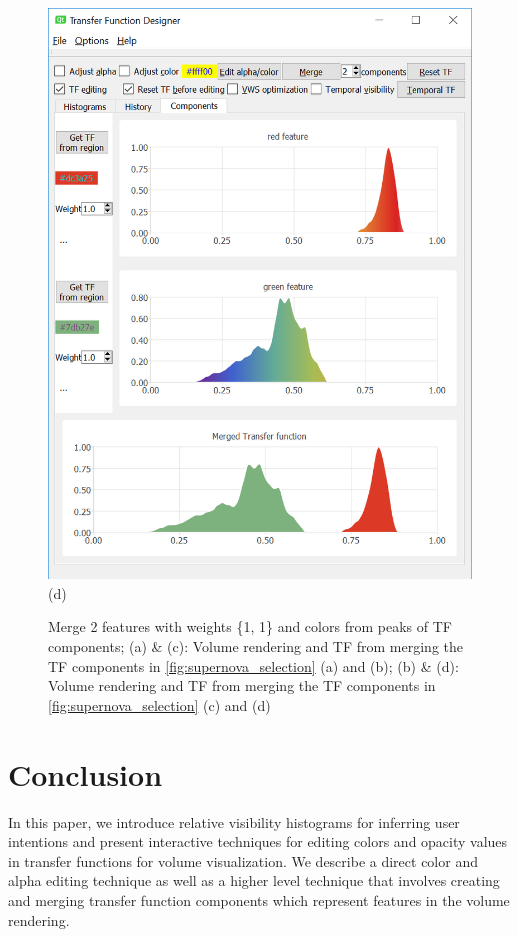 \documentclass[twoside,twocolumn,10pt]{article}
\begin{document}
\begin{figure}
\begin{minipage}{.16\textwidth}
		\includegraphics[width=1\linewidth]{tf_supernova_merged_segment_red_green}
		(d)
	\end{minipage}
	\caption{Merge 2 features with weights \{1, 1\} and colors from peaks of TF components; (a) \& (c): Volume rendering and TF from merging the TF components in \autoref{fig:supernova_selection} (a) and (b); (b) \& (d): Volume rendering and TF from merging the TF components in \autoref{fig:supernova_selection} (c) and (d)}
	\label{fig:supernova_merge}
\end{figure}

\section{Conclusion}
In this paper, we introduce relative visibility histograms for inferring user intentions and present interactive techniques for editing colors and opacity values in transfer functions for volume visualization. We describe a direct color and alpha editing technique as well as a higher level technique that involves creating and merging transfer function components which represent features in the volume rendering.
\end{document}
